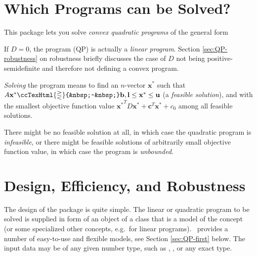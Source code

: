 \newcommand{\qprel}{\ccTexHtml{\gtreqless}{&nbsp;~&nbsp;}}
\newcommand{\qpx}{\mathbf{x}}
\newcommand{\qpl}{\mathbf{l}}
\newcommand{\qpu}{\mathbf{u}}
\newcommand{\qpc}{\mathbf{c}}
\newcommand{\qpb}{\mathbf{b}}
\newcommand{\qpy}{\mathbf{y}}
\newcommand{\qpw}{\mathbf{w}}
\newcommand{\qplambda}{\mathbf{\lambda}}




\section{Which Programs can be Solved?\label{sec:QP-def}}
This package lets you solve \emph{convex quadratic programs} of the 
general form
%


If $D=0$, the program (QP) is actually a \emph{linear program}.
Section \ref{sec:QP-robustness} on robustness briefly discusses
the case of $D$ not being positive-semidefinite and therefore not
defining a convex program. 

\emph{Solving} the program means to find an $n$-vector $\qpx^*$ 
such that $A\qpx^*\qprel \qpb, 
\qpl\leq \qpx^*\leq \qpu$ (a \emph{feasible solution}),
and with the smallest objective function value 
${\qpx^*}^TD\qpx^*+\qpc^T\qpx^*+c_0$ 
among all feasible solutions. 

There might be no feasible solution at all, in which
case the quadratic program is \emph{infeasible}, or there might be
feasible solutions of arbitrarily small objective function value, in
which case the program is \emph{unbounded}.  

\section{Design, Efficiency, and Robustness}
The design of the package is quite simple. The linear
or quadratic program to be solved is supplied in form of an object 
of a class that is a model of the concept  
(or some specialized other concepts, e.g.\ for linear programs). \cgal\
provides a number of easy-to-use and flexible models, see Section 
\ref{sec:QP-first} below. The input data may be of any given number 
type, such as \ccc{double}, \ccc{int}, or any exact type. 

